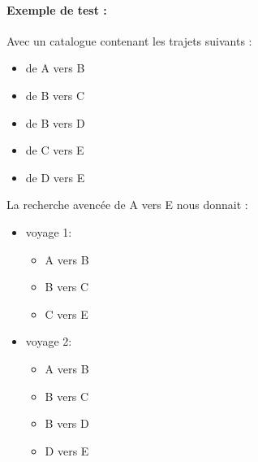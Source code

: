 \documentclass[10pt,a4paper,twoside]{article}
\begin{document}
\paragraph{Exemple de test :} Avec un catalogue contenant les trajets suivants :
\begin{itemize}
\item de A vers B
\item de B vers C
\item de B vers D
\item de C vers E
\item de D vers E
\end{itemize}
La recherche avencée de A vers E nous donnait :
\begin{itemize}
\item voyage 1:
\begin{itemize}
\item A vers B
\item B vers C
\item C vers E
\end{itemize}
\item voyage 2:
\begin{itemize}
\item A vers B
\item B vers C
\item B vers D
\item D vers E
\end{itemize}
\end{itemize}
\end{document}
